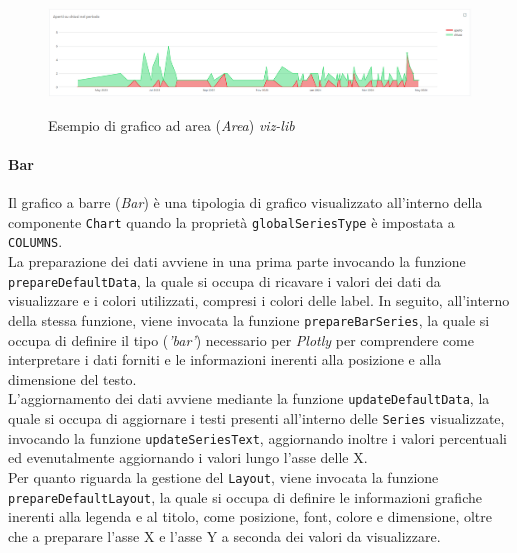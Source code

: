 \begin{figure}[H]
    \centering
    \includegraphics[alt={Esempio di grafico ad area viz-lib}, width=1 \columnwidth, height=\maxdimen, keepaspectratio]{img/ex_area.png}
    \caption{Esempio di grafico ad area (\textit{Area}) \textit{viz-lib}}
    \label{fig:area-example}
\end{figure}

\paragraph{Bar}
Il grafico a barre (\textit{Bar}) è una tipologia di grafico visualizzato all'interno della componente \texttt{Chart} quando la proprietà \texttt{globalSeriesType} è impostata a \texttt{COLUMNS}. \\
La preparazione dei dati avviene in una prima parte invocando la funzione \\
\texttt{prepareDefaultData}, la quale si occupa di ricavare i valori dei dati da visualizzare e i colori utilizzati, compresi i
colori delle label. In seguito, all'interno della stessa funzione, viene invocata la funzione \texttt{prepareBarSeries}, la quale si occupa di definire il tipo (\textit{'bar'}) necessario per \textit{Plotly} per comprendere
come interpretare i dati forniti e le informazioni inerenti alla posizione e alla dimensione del testo. \\
L'aggiornamento dei dati avviene mediante la funzione \texttt{updateDefaultData}, la quale si occupa di aggiornare i testi presenti all'interno delle \texttt{Series} visualizzate, invocando la funzione
\texttt{updateSeriesText}, aggiornando inoltre i valori percentuali ed evenutalmente aggiornando i valori lungo l'asse delle X. \\
Per quanto riguarda la gestione del \texttt{Layout}, viene invocata la funzione \\
\texttt{prepareDefaultLayout}, la quale si occupa di definire le informazioni grafiche inerenti alla legenda e al titolo, come posizione,
font, colore e dimensione, oltre che a preparare l'asse X e l'asse Y a seconda dei valori da visualizzare.

